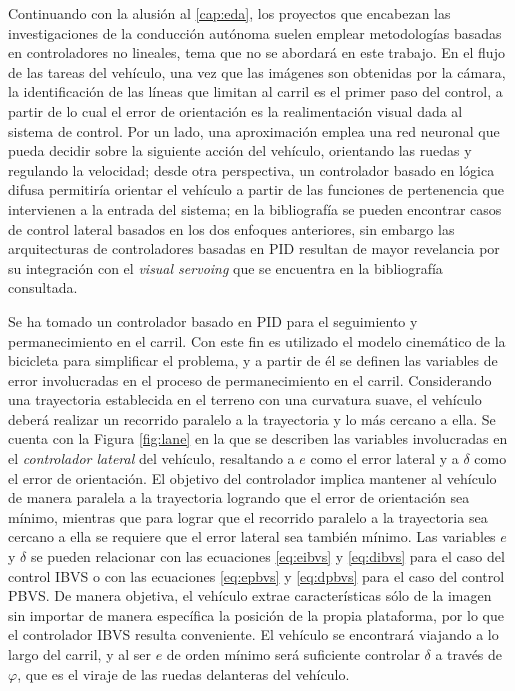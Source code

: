 \par Continuando con la alusión al \autoref{cap:eda}, los proyectos que encabezan las investigaciones de la conducción autónoma suelen emplear metodologías basadas en controladores no lineales, tema que no se abordará en este trabajo. En el flujo de las tareas del vehículo, una vez que las imágenes son obtenidas por la cámara, la identificación de las líneas que limitan al carril es el primer paso del control, a partir de lo cual el error de orientación es la realimentación visual dada al sistema de control. Por un lado, una aproximación emplea una red neuronal que pueda decidir sobre la siguiente acción del vehículo, orientando las ruedas y regulando la velocidad; desde otra perspectiva, un controlador basado en lógica difusa permitiría orientar el vehículo a partir de las funciones de pertenencia que intervienen a la entrada del sistema; en la bibliografía se pueden encontrar casos de control lateral basados en los dos enfoques anteriores, sin embargo las arquitecturas de controladores basadas en PID resultan de mayor revelancia por su integración con el {\it visual servoing} que se encuentra en la bibliografía consultada.
\par Se ha tomado un controlador basado en PID para el seguimiento y permanecimiento en el carril. Con este fin es utilizado el modelo cinemático de la bicicleta para simplificar el problema, y a partir de él se definen las variables de error involucradas en el proceso de permanecimiento en el carril. Considerando una trayectoria establecida en el terreno con una curvatura suave, el vehículo deberá realizar un recorrido paralelo a la trayectoria y lo más cercano a ella. Se cuenta con la Figura \ref{fig:lane} en la que se describen las variables involucradas en el {\it controlador lateral} del vehículo, resaltando a $e$ como el error lateral y a $\delta$ como el error de orientación. El objetivo del controlador implica mantener al vehículo de manera paralela a la trayectoria logrando que el error de orientación sea mínimo, mientras que para lograr que el recorrido paralelo a la trayectoria sea cercano a ella se requiere que el error lateral sea también mínimo. Las variables $e$ y $\delta$ se pueden relacionar con las ecuaciones \eqref{eq:eibvs} y \eqref{eq:dibvs} para el caso del control IBVS o con las ecuaciones \eqref{eq:epbvs} y \eqref{eq:dpbvs} para el caso del control PBVS. De manera objetiva, el vehículo extrae características sólo de la imagen sin importar de manera específica la posición de la propia plataforma, por lo que el controlador IBVS resulta conveniente. El vehículo se encontrará viajando a lo largo del carril, y al ser $e$ de orden mínimo será suficiente controlar $\delta$ a través de $\varphi$, que es el viraje de las ruedas delanteras del vehículo.
